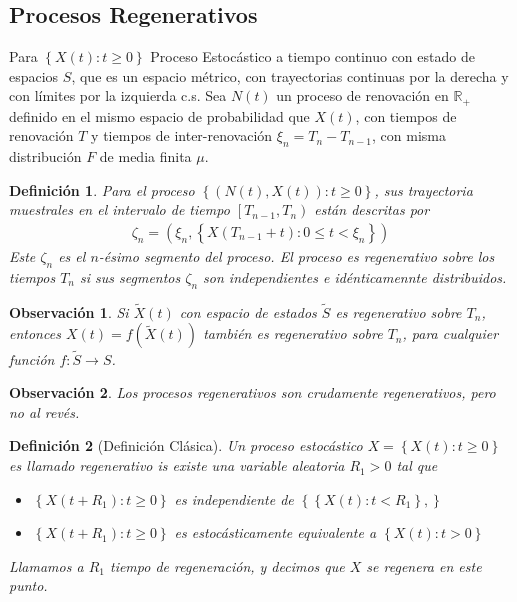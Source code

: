 \documentclass{article}
\newtheorem{Def}{Definición}
\newtheorem{Obs}{Observación}
\newcommand{\rea}{\mathbb{R}}
\begin{document}
\subsection{Procesos Regenerativos}

Para $\left\{X\left(t\right):t\geq0\right\}$ Proceso Estoc\'astico a tiempo continuo con estado de espacios $S$, que es un espacio m\'etrico, con trayectorias continuas por la derecha y con l\'imites por la izquierda c.s. Sea $N\left(t\right)$ un proceso de renovaci\'on en $\rea_{+}$ definido en el mismo espacio de probabilidad que $X\left(t\right)$, con tiempos de renovaci\'on $T$ y tiempos de inter-renovaci\'on $\xi_{n}=T_{n}-T_{n-1}$, con misma distribuci\'on $F$ de media finita $\mu$.



\begin{Def}
Para el proceso $\left\{\left(N\left(t\right),X\left(t\right)\right):t\geq0\right\}$, sus trayectoria muestrales en el intervalo de tiempo $\left[T_{n-1},T_{n}\right)$ est\'an descritas por
\begin{eqnarray*}
\zeta_{n}=\left(\xi_{n},\left\{X\left(T_{n-1}+t\right):0\leq t<\xi_{n}\right\}\right)
\end{eqnarray*}
Este $\zeta_{n}$ es el $n$-\'esimo segmento del proceso. El proceso es regenerativo sobre los tiempos $T_{n}$ si sus segmentos $\zeta_{n}$ son independientes e id\'enticamennte distribuidos.
\end{Def}


\begin{Obs}
Si $\tilde{X}\left(t\right)$ con espacio de estados $\tilde{S}$ es regenerativo sobre $T_{n}$, entonces $X\left(t\right)=f\left(\tilde{X}\left(t\right)\right)$ tambi\'en es regenerativo sobre $T_{n}$, para cualquier funci\'on $f:\tilde{S}\rightarrow S$.
\end{Obs}

\begin{Obs}
Los procesos regenerativos son crudamente regenerativos, pero no al rev\'es.
\end{Obs}

\begin{Def}[Definici\'on Cl\'asica]
Un proceso estoc\'astico $X=\left\{X\left(t\right):t\geq0\right\}$ es llamado regenerativo is existe una variable aleatoria $R_{1}>0$ tal que
\begin{itemize}
\item[i)] $\left\{X\left(t+R_{1}\right):t\geq0\right\}$ es independiente de $\left\{\left\{X\left(t\right):t<R_{1}\right\},\right\}$
\item[ii)] $\left\{X\left(t+R_{1}\right):t\geq0\right\}$ es estoc\'asticamente equivalente a $\left\{X\left(t\right):t>0\right\}$
\end{itemize}

Llamamos a $R_{1}$ tiempo de regeneraci\'on, y decimos que $X$ se regenera en este punto.
\end{Def}
\end{document}
